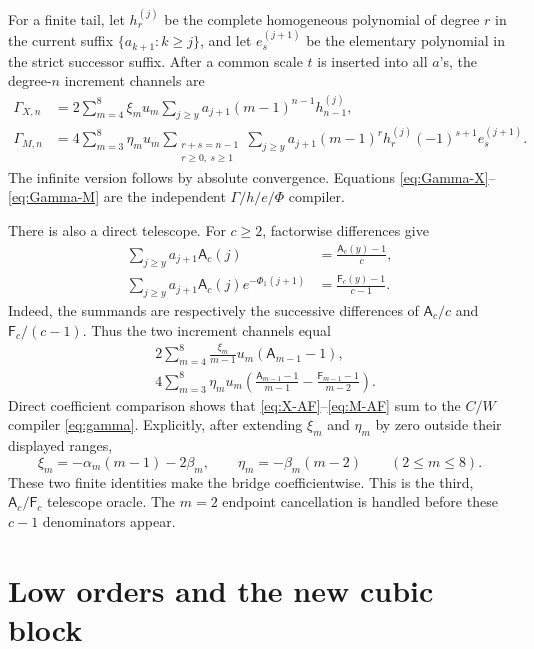 \documentclass[11pt]{article}
\theoremstyle{definition}
\theoremstyle{remark}
\newcommand{\Afun}{\mathsf A}
\newcommand{\Ffun}{\mathsf F}
\begin{document}
For a finite tail, let $h_r^{(j)}$ be the complete homogeneous polynomial
of degree $r$ in the current suffix $\{a_{k+1}:k\ge j\}$, and let
$e_s^{(j+1)}$ be the elementary polynomial in the strict successor suffix.
After a common scale $t$ is inserted into all $a$'s, the degree-$n$
increment channels are
\begin{align}
 \Gamma_{X,n}
 &=2\sum_{m=4}^8\xi_mu_m\sum_{j\ge y}
 a_{j+1}(m-1)^{n-1}h_{n-1}^{(j)},
 \label{eq:Gamma-X}\\
 \Gamma_{M,n}
 &=4\sum_{m=3}^8\eta_mu_m
 \sum_{\substack{r+s=n-1\\r\ge0,\ s\ge1}}
 \sum_{j\ge y}a_{j+1}(m-1)^rh_r^{(j)}
 (-1)^{s+1}e_s^{(j+1)}.
 \label{eq:Gamma-M}
\end{align}
The infinite version follows by absolute convergence.  Equations
\eqref{eq:Gamma-X}--\eqref{eq:Gamma-M} are the independent
$\Gamma/h/e/\Phi$ compiler.

There is also a direct telescope.  For $c\ge2$, factorwise differences give
\begin{align}
 \sum_{j\ge y}a_{j+1}\Afun_c(j)
 &=\frac{\Afun_c(y)-1}{c},
 \label{eq:A-telescope}\\
 \sum_{j\ge y}a_{j+1}\Afun_c(j)e^{-\Phi_1(j+1)}
 &=\frac{\Ffun_c(y)-1}{c-1}.
 \label{eq:F-telescope}
\end{align}
Indeed, the summands are respectively the successive differences of
$\Afun_c/c$ and $\Ffun_c/(c-1)$.  Thus the two increment channels equal
\begin{align}
 &2\sum_{m=4}^8\frac{\xi_m}{m-1}u_m(\Afun_{m-1}-1),
 \label{eq:X-AF}\\
 &4\sum_{m=3}^8\eta_mu_m\left(
 \frac{\Afun_{m-1}-1}{m-1}
 -\frac{\Ffun_{m-1}-1}{m-2}\right).
 \label{eq:M-AF}
\end{align}
Direct coefficient comparison shows that
\eqref{eq:X-AF}--\eqref{eq:M-AF} sum to the $C/W$ compiler
\eqref{eq:gamma}.  Explicitly, after extending $\xi_m$ and $\eta_m$ by
zero outside their displayed ranges,
\[
 \xi_m=-\alpha_m(m-1)-2\beta_m,
 \qquad \eta_m=-\beta_m(m-2)\qquad(2\le m\le8).
\]
These two finite identities make the bridge coefficientwise.  This is the
third, $\Afun_c/\Ffun_c$ telescope oracle.
The $m=2$ endpoint cancellation is handled before these $c-1$ denominators
appear.

\section{Low orders and the new cubic block}
\end{document}
